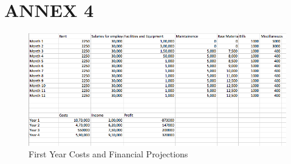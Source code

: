 \documentclass[11pt]{article}
\begin{document}
\newpage
\section{ANNEX 4}

\begin{figure}[h!]
	\centering
	\caption{First Year Costs and Financial Projections}
	\includegraphics[width=\textwidth]{costs.png}
\end{figure}
\newpage
\end{document}
